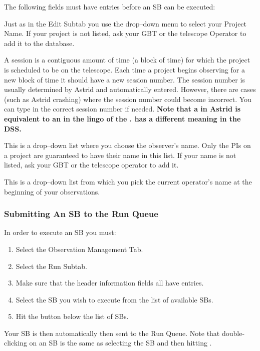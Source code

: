 The following fields must have entries before an \gls{SB} can be executed:
\begin{description}[leftmargin=*]
\item[Project:] Just as in the Edit Subtab you use the drop--down menu to select
your Project Name. If your project is not listed, ask your \gls{GBT}  or the
telescope Operator to add it to the database.
\item[Session:] A session is a contiguous amount of time (a block of time) for which
the project is scheduled to be on the telescope.  Each time a project begins
observing for a new block of time it should have a new session number. The session
number is usually determined by \gls{Astrid} and automatically entered. However, there
are cases (such as \gls{Astrid} crashing) where the session number could become
incorrect.  You can type in the correct session number if needed. {\bf Note that a
 in \gls{Astrid} is equivalent to an  in the lingo of the
.  has a different meaning in the \gls{DSS}.}
\item[Observer's Name:] This is a drop--down list where you choose the observer's
name.  Only the \glspl{PI} on a project are guaranteed to have their name in this list.
If your name is not listed, ask your \gls{GBT}  or the telescope operator to
add it.
\item[Operator's Name:] This is a drop--down list from which you pick the current
operator's name at the beginning of your observations.
\end{description}

\newpage

\subsubsection{Submitting An SB to the Run Queue}

In order to execute an \gls{SB} you must:
\begin{enumerate}[label=\bfseries{Step \arabic*.},leftmargin=*,
labelindent=\parindent, itemsep=1pt]
\item Select the Observation Management Tab. 
\item Select the Run Subtab.  
\item Make sure that the header information fields all have entries.  
\item Select the \gls{SB} you wish to execute from the list of available \glspl{SB}.  
\item Hit the  button below the list of \glspl{SB}.
\end{enumerate}
Your \gls{SB} is then automatically then sent to the Run Queue.  Note that double-clicking
on an \gls{SB} is the same as selecting the \gls{SB} and then hitting .

